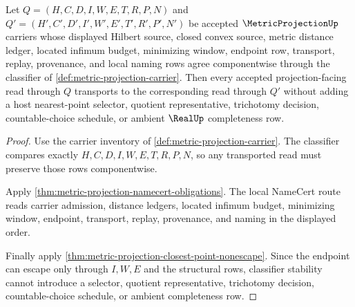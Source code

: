 \begin{theorem}\label{thm:metric-projection-obligation-carrier-stability}
Let $Q=(H,C,D,I,W,E,T,R,P,N)$ and $Q'=(H',C',D',I',W',E',T',R',P',N')$ be accepted $\MetricProjectionUp$ carriers whose displayed Hilbert source, closed convex source, metric distance ledger, located infimum budget, minimizing window, endpoint row, transport, replay, provenance, and local naming rows agree componentwise through the classifier of \autoref{def:metric-projection-carrier}. Then every accepted projection-facing read through $Q$ transports to the corresponding read through $Q'$ without adding a host nearest-point selector, quotient representative, trichotomy decision, countable-choice schedule, or ambient $\RealUp$ completeness row.
\end{theorem}
\begin{proof}
Use the carrier inventory of \autoref{def:metric-projection-carrier}. The classifier compares exactly $H,C,D,I,W,E,T,R,P,N$, so any transported read must preserve those rows componentwise.

Apply \autoref{thm:metric-projection-namecert-obligations}. The local NameCert route reads carrier admission, distance ledgers, located infimum budget, minimizing window, endpoint, transport, replay, provenance, and naming in the displayed order.

Finally apply \autoref{thm:metric-projection-closest-point-nonescape}. Since the endpoint can escape only through $I,W,E$ and the structural rows, classifier stability cannot introduce a selector, quotient representative, trichotomy decision, countable-choice schedule, or ambient completeness row.
\end{proof}

